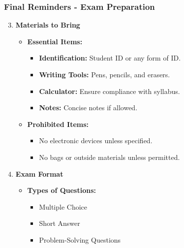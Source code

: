 \documentclass[aspectratio=169]{beamer}
\begin{document}
\begin{frame}[fragile]
    \frametitle{Final Reminders - Exam Preparation}
    \begin{enumerate}
        \setcounter{enumi}{2}
        \item \textbf{Materials to Bring}
            \begin{itemize}
                \item \textbf{Essential Items:}
                    \begin{itemize}
                        \item \textbf{Identification:} Student ID or any form of ID.
                        \item \textbf{Writing Tools:} Pens, pencils, and erasers.
                        \item \textbf{Calculator:} Ensure compliance with syllabus.
                        \item \textbf{Notes:} Concise notes if allowed.
                    \end{itemize}
                \item \textbf{Prohibited Items:} 
                    \begin{itemize}
                        \item No electronic devices unless specified.
                        \item No bags or outside materials unless permitted.
                    \end{itemize}
            \end{itemize}

        \item \textbf{Exam Format}
            \begin{itemize}
                \item \textbf{Types of Questions:}
                    \begin{itemize}
                        \item Multiple Choice
                        \item Short Answer
                        \item Problem-Solving Questions
                    \end{itemize}
            \end{itemize}
    \end{enumerate}
\end{frame}
\end{document}
